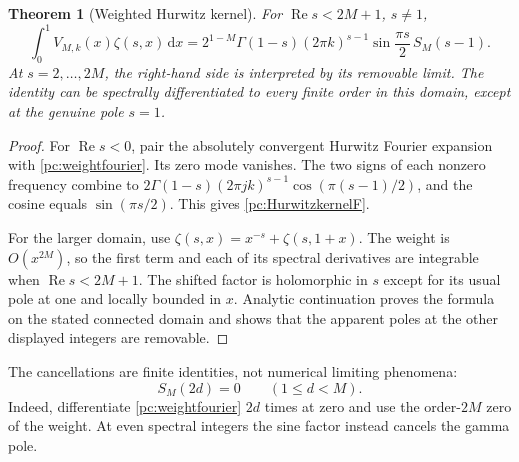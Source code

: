 \documentclass[11pt,a4paper]{article}
\numberwithin{equation}{section}
\newtheorem{theorem}{Theorem}[section]
\theoremstyle{definition}
\newcommand{\dd}{\,\mathrm dx}
\newcommand{\Rea}{\operatorname{Re}}
\begin{document}
\begin{theorem}[Weighted Hurwitz kernel]\label{pc:Hurwitzkernel}
For $\Rea s<2M+1$, $s\ne1$,
\begin{equation}\label{pc:HurwitzkernelF}
 \int_0^1 V_{M,k}(x)\zeta(s,x)\dd
 =2^{1-M}\Gamma(1-s)(2\pi k)^{s-1}
                  \sin\frac{\pi s}{2}\,S_M(s-1).
\end{equation}
At $s=2,\ldots,2M$, the right-hand side is interpreted by its removable limit. The identity can be spectrally differentiated to every finite order in this domain, except at the genuine pole $s=1$.
\end{theorem}
\begin{proof}
For $\Rea s<0$, pair the absolutely convergent Hurwitz Fourier expansion with \eqref{pc:weightfourier}. Its zero mode vanishes. The two signs of each nonzero frequency combine to
$2\Gamma(1-s)(2\pi jk)^{s-1}\cos(\pi(s-1)/2)$, and the cosine equals $\sin(\pi s/2)$. This gives \eqref{pc:HurwitzkernelF}.

For the larger domain, use $\zeta(s,x)=x^{-s}+\zeta(s,1+x)$. The weight is $O(x^{2M})$, so the first term and each of its spectral derivatives are integrable when $\Rea s<2M+1$. The shifted factor is holomorphic in $s$ except for its usual pole at one and locally bounded in $x$. Analytic continuation proves the formula on the stated connected domain and shows that the apparent poles at the other displayed integers are removable.
\end{proof}
The cancellations are finite identities, not numerical limiting phenomena:
\begin{equation}\label{pc:SMzeros}
 S_M(2d)=0\qquad(1\le d<M).
\end{equation}
Indeed, differentiate \eqref{pc:weightfourier} $2d$ times at zero and use the order-$2M$ zero of the weight. At even spectral integers the sine factor instead cancels the gamma pole.
\end{document}

